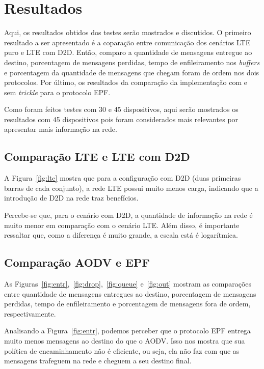 \documentclass[11pt,a4paper,titlepage]{article}
\begin{document}
\section{Resultados}\label{sec:results}

Aqui, os resultados obtidos dos testes serão mostrados e discutidos.
O primeiro resultado a ser apresentado é a coparação entre comunicação dos cenários LTE puro e LTE com D2D.
Então, comparo a quantidade de mensagens entregue ao destino, porcentagem de mensagens perdidas, tempo de enfileiramento nos \textit{buffers} e porcentagem da quantidade de mensagens que chegam foram de ordem nos dois protocolos.
Por último, os resultados da comparação da implementação com e sem \textit{trickle} para o protocolo EPF.

Como foram feitos testes com 30 e 45 dispositivos, aqui serão mostrados os resultados com 45 dispositivos pois foram considerados mais relevantes por apresentar mais informação na rede.

\subsection{Comparação LTE e LTE com D2D}\label{subsec:lte}

A Figura~\ref{fig:lte} mostra que para a configuração com D2D (duas primeiras barras de cada conjunto), a rede LTE possui muito menos carga, indicando que a introdução de D2D na rede traz benefícios.

Percebe-se que, para o cenário com D2D, a quantidade de informação na rede é muito menor em comparação com o cenário LTE.
Além disso, é importante ressaltar que, como a diferença é muito grande, a escala está é logarítmica.

\subsection{Comparação AODV e EPF}\label{subsec:aodvepf}

As Figuras~\ref{fig:entr},~\ref{fig:drop},~\ref{fig:queue} e~\ref{fig:out} mostram as comparações entre quantidade de mensagens entregues ao destino, porcentagem de mensagens perdidas, tempo de enfileiramento e porcentagem de mensagens fora de ordem, respectivamente.

Analisando a Figura~\ref{fig:entr}, podemos perceber que o protocolo EPF entrega muito menos mensagens ao destino do que o AODV.
Isso nos mostra que sua política de encaminhamento não é eficiente, ou seja, ela não faz com que as mensagens trafeguem na rede e cheguem a seu destino final.
\end{document}
